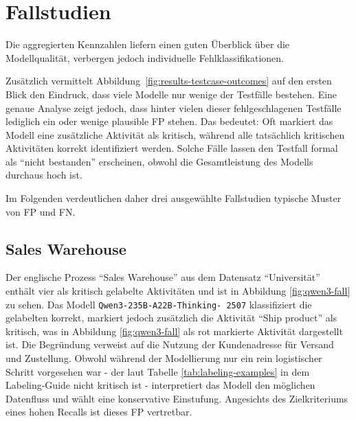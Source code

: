 \section{Fallstudien}\label{sec:fallstudien}

Die aggregierten Kennzahlen liefern einen guten Überblick über die Modellqualität, verbergen jedoch individuelle Fehlklassifikationen.

Zusätzlich vermittelt Abbildung~\ref{fig:results-testcase-outcomes} auf den ersten Blick den Eindruck, dass viele Modelle nur wenige der Testfälle bestehen. Eine genaue Analyse zeigt jedoch, dass hinter vielen dieser fehlgeschlagenen Testfälle lediglich ein oder wenige plausible \ac{FP} stehen. Das bedeutet: Oft markiert das Modell eine zusätzliche Aktivität als kritisch, während alle tatsächlich kritischen Aktivitäten korrekt identifiziert werden. Solche Fälle lassen den Testfall formal als \enquote{nicht bestanden} erscheinen, obwohl die Gesamtleistung des Modells durchaus hoch ist.

Im Folgenden verdeutlichen daher drei ausgewählte Fallstudien typische Muster von \ac{FP} und \ac{FN}.

\subsection*{Sales Warehouse}

Der englische Prozess \enquote{Sales Warehouse} aus dem Datensatz \enquote{Universität} enthält vier als kritisch gelabelte Aktivitäten und ist in Abbildung \ref{fig:qwen3-fall} zu sehen. Das Modell \texttt{Qwen3-235B-A22B-Thinking-\linebreak~2507} klassifiziert die gelabelten korrekt, markiert jedoch zusätzlich die Aktivität \enquote{Ship product} als kritisch, was in Abbildung \ref{fig:qwen3-fall} als rot markierte Aktivität dargestellt ist. Die Begründung verweist auf die Nutzung der Kundenadresse für Versand und Zustellung. Obwohl während der Modellierung nur ein rein logistischer Schritt vorgesehen war - der laut Tabelle \ref{tab:labeling-examples} in dem Labeling-Guide nicht kritisch ist - interpretiert das Modell den möglichen Datenfluss und wählt eine konservative Einstufung. Angesichts des Zielkriteriums eines hohen Recalls ist dieses \ac{FP} vertretbar.

